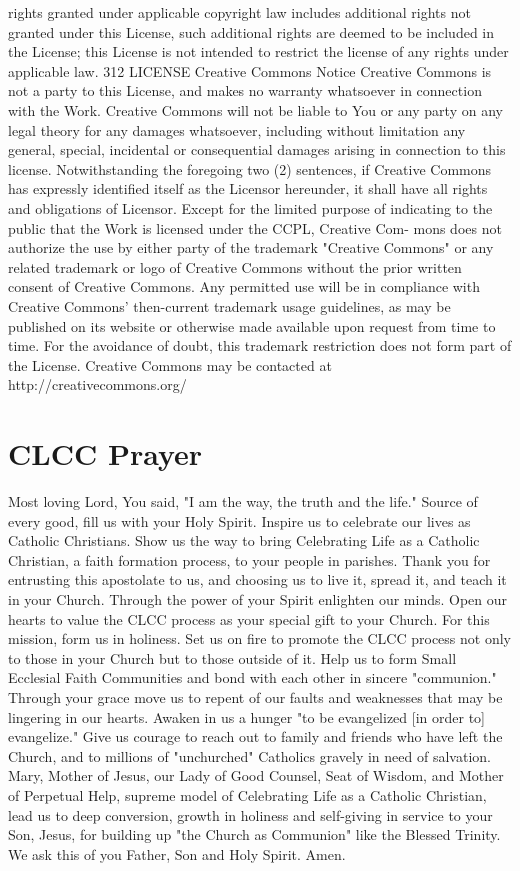 \documentclass[oneside]{book}
\begin{document}
rights granted under applicable copyright law includes additional rights not
granted under this License, such additional rights are deemed to be included in
the License; this License is not intended to restrict the license of any rights
under applicable law.  312 LICENSE Creative Commons Notice Creative Commons is
not a party to this License, and makes no warranty whatsoever in connection with
the Work. Creative Commons will not be liable to You or any party on any legal
theory for any damages whatsoever, including without limitation any general,
special, incidental or consequential damages arising in connection to this
license. Notwithstanding the foregoing two (2) sentences, if Creative Commons
has expressly identified itself as the Licensor hereunder, it shall have all
rights and obligations of Licensor.  Except for the limited purpose of
indicating to the public that the Work is licensed under the CCPL, Creative Com-
mons does not authorize the use by either party of the trademark "Creative
Commons" or any related trademark or logo of Creative Commons without the prior
written consent of Creative Commons. Any permitted use will be in compliance
with Creative Commons' then-current trademark usage guidelines, as may be
published on its website or otherwise made available upon request from time to
time. For the avoidance of doubt, this trademark restriction does not form part
of the License.  Creative Commons may be contacted at
http://creativecommons.org/

\part{CLCC Prayer}

Most loving Lord, You said, "I am the way, the truth and the life." Source of
every good, fill us with your Holy Spirit. Inspire us to celebrate our lives as
Catholic Christians. Show us the way to bring Celebrating Life as a Catholic
Christian, a faith formation process, to your people in parishes. Thank you for
entrusting this apostolate to us, and choosing us to live it, spread it, and
teach it in your Church.  Through the power of your Spirit enlighten our
minds. Open our hearts to value the CLCC process as your special gift to your
Church. For this mission, form us in holiness. Set us on fire to promote the
CLCC process not only to those in your Church but to those outside of it.  Help
us to form Small Ecclesial Faith Communities and bond with each other in sincere
"communion." Through your grace move us to repent of our faults and weaknesses
that may be lingering in our hearts.  Awaken in us a hunger "to be evangelized
[in order to] evangelize." Give us courage to reach out to family and friends
who have left the Church, and to millions of "unchurched" Catholics gravely in
need of salvation.  Mary, Mother of Jesus, our Lady of Good Counsel, Seat of
Wisdom, and Mother of Perpetual Help, supreme model of Celebrating Life as a
Catholic Christian, lead us to deep conversion, growth in holiness and
self-giving in service to your Son, Jesus, for building up "the Church as
Communion" like the Blessed Trinity. We ask this of you Father, Son and Holy
Spirit. Amen.

\end{document}
